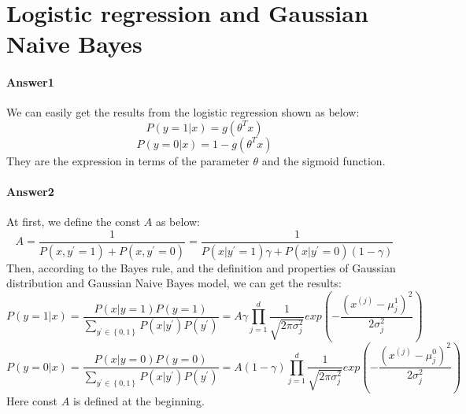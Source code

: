 \documentclass[paper=a4, fontsize=11pt]{scrartcl} %
\numberwithin{equation}{section} %
\numberwithin{figure}{section} %
\numberwithin{table}{section} %
\begin{document}
\section{Logistic regression and Gaussian Naive Bayes}

\paragraph{\textbf{Answer1}}
We can easily get the results from the logistic regression shown as below:
\begin{equation*}
P\left ( y=1|x \right )=g\left ( \theta ^{T}x \right )
\end{equation*}
\begin{equation*}
P\left ( y=0|x \right )=1-g\left ( \theta ^{T}x \right )
\end{equation*}
They are the expression in terms of the parameter $\theta$ and the sigmoid function.

\paragraph{\textbf{Answer2}}
At first, we define the const $A$ as below:
\begin{equation*}
A =\frac{1}{P\left ( x,y^{'}=1 \right ) +P\left ( x,y^{'}=0 \right )}=\frac{1}{P\left ( x|y^{'}=1 \right )\gamma +P\left ( x|y^{'}=0 \right )\left ( 1-\gamma \right )}
\end{equation*}
Then, according to the Bayes rule, and the definition and properties of Gaussian distribution and Gaussian Naive Bayes model, we can get the results:
\begin{equation*}
P\left ( y=1|x \right )=\frac{P\left ( x|y=1 \right )P\left ( y=1 \right )}{\sum_{y^{'}\in \left \{ 0,1 \right \}}P\left ( x|y^{'} \right )P\left ( y^{'} \right )}=A \gamma\prod_{j=1}^{d}\frac{1}{\sqrt{2\pi \sigma _{j}^{2}}}exp\left ( -\frac{\left ( x^{\left ( j \right )}-\mu _{j}^{1} \right )^{2}}{2\sigma _{j}^{2}} \right )
\end{equation*}
\begin{equation*}
P\left ( y=0|x \right )=\frac{P\left ( x|y=0 \right )P\left ( y=0 \right )}{\sum_{y^{'}\in \left \{ 0,1 \right \}}P\left ( x|y^{'} \right )P\left ( y^{'} \right )}=A \left ( 1-\gamma \right )\prod_{j=1}^{d}\frac{1}{\sqrt{2\pi \sigma _{j}^{2}}}exp\left ( -\frac{\left ( x^{\left ( j \right )}-\mu _{j}^{0} \right )^{2}}{2\sigma _{j}^{2}} \right )
\end{equation*}
Here const $A$ is defined at the beginning.
\end{document}

